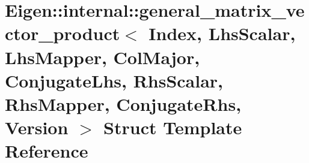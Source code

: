 \hypertarget{struct_eigen_1_1internal_1_1general__matrix__vector__product_3_01_index_00_01_lhs_scalar_00_01_l2767aff966c7bf3a7d425c9d340a95e8}{}\section{Eigen\+:\+:internal\+:\+:general\+\_\+matrix\+\_\+vector\+\_\+product$<$ Index, Lhs\+Scalar, Lhs\+Mapper, Col\+Major, Conjugate\+Lhs, Rhs\+Scalar, Rhs\+Mapper, Conjugate\+Rhs, Version $>$ Struct Template Reference}
\label{struct_eigen_1_1internal_1_1general__matrix__vector__product_3_01_index_00_01_lhs_scalar_00_01_l2767aff966c7bf3a7d425c9d340a95e8}
